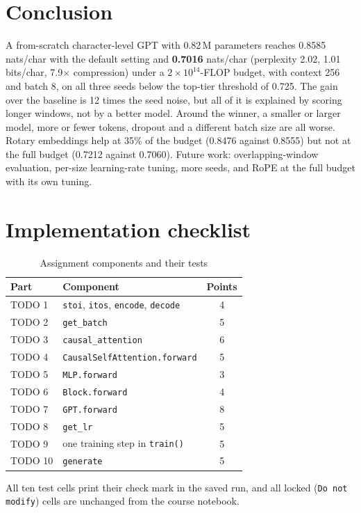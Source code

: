 \documentclass[10pt,twocolumn]{article}
\renewcommand{\thesection}{\Roman{section}}
\begin{document}
\section{Conclusion}
A from-scratch character-level GPT with 0.82\,M parameters reaches 0.8585 nats/char with the default setting and \textbf{0.7016} nats/char (perplexity 2.02, 1.01 bits/char, 7.9$\times$ compression) under a $2\times10^{14}$-FLOP budget, with context 256 and batch 8, on all three seeds below the top-tier threshold of 0.725. The gain over the baseline is 12 times the seed noise, but all of it is explained by scoring longer windows, not by a better model. Around the winner, a smaller or larger model, more or fewer tokens, dropout and a different batch size are all worse. Rotary embeddings help at 35\% of the budget (0.8476 against 0.8555) but not at the full budget (0.7212 against 0.7060). Future work: overlapping-window evaluation, per-size learning-rate tuning, more seeds, and RoPE at the full budget with its own tuning.

\appendix
\renewcommand{\thesection}{\Alph{section}}
\section{Implementation checklist}\label{app:impl}
\begin{table}[H]\centering\caption{Assignment components and their tests}\label{tab:todo}
\footnotesize\begin{tabular}{llc}\toprule
Part & Component & Points\\\midrule
TODO 1 & \texttt{stoi}, \texttt{itos}, \texttt{encode}, \texttt{decode} & 4\\
TODO 2 & \texttt{get\_batch} & 5\\
TODO 3 & \texttt{causal\_attention} & 6\\
TODO 4 & \texttt{CausalSelfAttention.forward} & 5\\
TODO 5 & \texttt{MLP.forward} & 3\\
TODO 6 & \texttt{Block.forward} & 4\\
TODO 7 & \texttt{GPT.forward} & 8\\
TODO 8 & \texttt{get\_lr} & 5\\
TODO 9 & one training step in \texttt{train()} & 5\\
TODO 10 & \texttt{generate} & 5\\\bottomrule\end{tabular}\end{table}
All ten test cells print their check mark in the saved run, and all locked (\texttt{Do not modify}) cells are unchanged from the course notebook.
\end{document}

